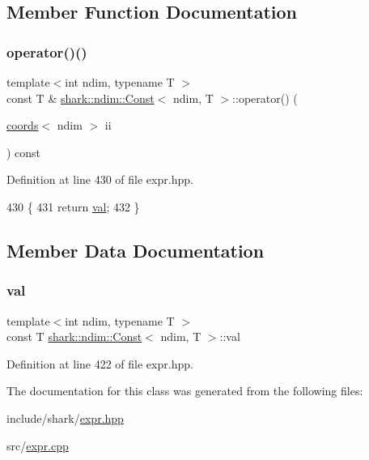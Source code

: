 \subsection{Member Function Documentation}
\hypertarget{classshark_1_1ndim_1_1_const_aee20b9c9f89839ee80bcb42bab83281e}{}\label{classshark_1_1ndim_1_1_const_aee20b9c9f89839ee80bcb42bab83281e} 
\subsubsection{\texorpdfstring{operator()()}{operator()()}}
{\footnotesize\ttfamily template$<$int ndim, typename T $>$ \\
const T \& \hyperlink{classshark_1_1ndim_1_1_const}{shark\+::ndim\+::\+Const}$<$ ndim, T $>$\+::operator() (\begin{DoxyParamCaption}\item[{\hyperlink{structshark_1_1ndim_1_1coords}{coords}$<$ ndim $>$}]{ii }\end{DoxyParamCaption}) const\hspace{0.3cm}{\ttfamily [inline]}}



Definition at line 430 of file expr.\+hpp.


\begin{DoxyCode}
430                                                                     \{
431             \textcolor{keywordflow}{return} \hyperlink{classshark_1_1ndim_1_1_const_aa7b1fd3a202063f3c8d08d75a890e4b0}{val};
432         \}
\end{DoxyCode}


\subsection{Member Data Documentation}
\hypertarget{classshark_1_1ndim_1_1_const_aa7b1fd3a202063f3c8d08d75a890e4b0}{}\label{classshark_1_1ndim_1_1_const_aa7b1fd3a202063f3c8d08d75a890e4b0} 
\subsubsection{\texorpdfstring{val}{val}}
{\footnotesize\ttfamily template$<$int ndim, typename T $>$ \\
const T \hyperlink{classshark_1_1ndim_1_1_const}{shark\+::ndim\+::\+Const}$<$ ndim, T $>$\+::val\hspace{0.3cm}{\ttfamily [private]}}



Definition at line 422 of file expr.\+hpp.



The documentation for this class was generated from the following files\+:\begin{DoxyCompactItemize}
\item 
include/shark/\hyperlink{expr_8hpp}{expr.\+hpp}\item 
src/\hyperlink{expr_8cpp}{expr.\+cpp}\end{DoxyCompactItemize}
